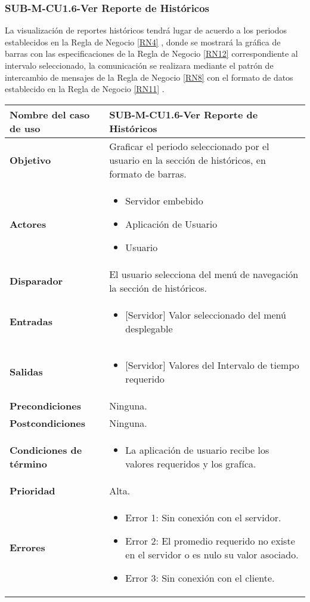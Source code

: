 \subsubsection{SUB-M-CU1.6-Ver Reporte de Históricos}\label{SUB-M-CU1.6}
La visualización de reportes históricos tendrá lugar de acuerdo a los periodos establecidos en la Regla de Negocio \ref{RN4} , donde se mostrará la gráfica de barras con las especificaciones de la Regla de Negocio \ref{RN12} correspondiente al  intervalo seleccionado, la comunicación se realizara mediante el patrón de intercambio de mensajes de la Regla de Negocio \ref{RN8} con el formato de datos establecido en la Regla de Negocio \ref{RN11} .

\begin{longtable}{|J{5cm}|J{10.3cm}|}
	\hline
	\textbf{Nombre del caso de uso} &
		SUB-M-CU1.6-Ver Reporte de Históricos \\ \hline
	\textbf{Objetivo} &
		Graficar el periodo seleccionado por el usuario en la sección de históricos, en formato de barras. \\ \hline
	\textbf{Actores} &
		\begin{itemize}
			\item Servidor embebido
			\item Aplicación de Usuario
			\item Usuario 
		\end{itemize} \\ \hline
	\textbf{Disparador} & 
		El usuario selecciona del menú de navegación la sección de históricos. \\ \hline 
	\textbf{Entradas} & 
		\begin{itemize}
			\item{[Servidor]} Valor seleccionado del menú desplegable
		\end{itemize}\\ \hline 
	\textbf{Salidas} & 
		\begin{itemize}
			\item{[Servidor]} Valores del Intervalo de tiempo requerido
		\end{itemize} \\ \hline
	\textbf{Precondiciones} &
		Ninguna.\\ \hline
	\textbf{Postcondiciones} &
		Ninguna.\\ \hline
	\textbf{Condiciones de término} & 
		\begin{itemize}
			\item La aplicación de usuario recibe los valores requeridos y los grafíca.
		\end{itemize} \\ \hline 
	\textbf{Prioridad} & 
		Alta. \\ \hline
	\textbf{Errores} & 
		\begin{itemize}
		    \item \label{CU5:Error1} Error 1: Sin conexión con el servidor.
			\item \label{CU5:Error2} Error 2: El promedio requerido no existe en el servidor o es nulo su valor asociado.
		    \item \label{CU5:Error3} Error 3: Sin conexión con el cliente.
			

\end{itemize}
\end{longtable}

